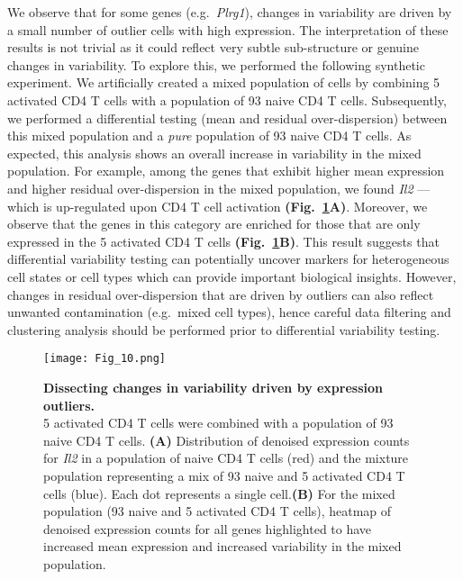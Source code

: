 We observe that for some genes (e.g.~\textit{Plrg1}), changes in variability are driven by a small number of outlier cells with high expression. The interpretation of these results is not trivial as it could reflect very subtle sub-structure or genuine changes in variability. To explore this, we performed the following synthetic experiment. We artificially created a mixed population of cells by combining 5 activated CD4\plus{} T cells with a population of 93 naive CD4\plus{} T cells. Subsequently, we performed a differential testing (mean and residual over-dispersion) between this mixed population and a \textit{pure} population of 93 naive CD4\plus{} T cells. As expected, this analysis shows an overall increase in variability in the mixed population. For example, among the genes that exhibit higher mean expression and higher residual over-dispersion in the mixed population, we found \textit{Il2} --- which is up-regulated upon CD4\plus{} T cell activation \textbf{(Fig.~\ref{fig2:mixture_population}A)}. Moreover, we observe that the genes in this category are enriched for those that are only expressed in the 5 activated CD4\plus{} T cells \textbf{(Fig.~\ref{fig2:mixture_population}B)}. This result suggests that differential variability testing can potentially uncover markers for heterogeneous cell states or cell types which can provide important biological insights. However, changes in residual over-dispersion that are driven by outliers can also reflect unwanted contamination 
(e.g.~mixed cell types), hence careful data filtering and clustering analysis should be performed prior to differential variability testing. 

\newpage

\begin{figure}[!h]
\centering
\texttt{[image: Fig\_10.png]}
\caption[Dissecting changes in variability driven by expression outliers]{\textbf{Dissecting changes in variability driven by expression outliers.}\\
5 activated CD4\plus{} T cells were combined with a population of 93 naive CD4\plus{} T cells. \textbf{(A)} Distribution of denoised expression counts for \textit{Il2} in a population of naive CD4\plus{} T cells (red) and the mixture population representing a mix of 93 naive and 5 activated CD4\plus{} T cells (blue). Each dot represents a single cell.\textbf{(B)} For the mixed population (93 naive and 5 activated CD4\plus{} T cells), heatmap of denoised expression counts for all genes highlighted to have increased mean expression and increased variability in the mixed population.}
\label{fig2:mixture_population}
\end{figure}


